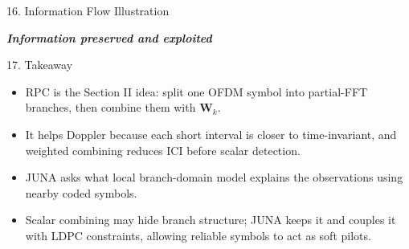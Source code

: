 \documentclass[aspectratio=169,10pt]{beamer}
\newcommand{\vW}{\bm{W}}
\newcommand{\vz}{\bm{z}}
\newcommand{\vC}{\bm{C}}
\newcommand{\hb}{\hat{b}}
\begin{document}
\begin{frame}{16. Information Flow Illustration}
\begin{center}
  \end{center}

  \vspace{-0.3em}
  \begin{center}
    {\footnotesize\itshape\bfseries\color{junagreen}Information preserved and exploited}
  \end{center}

\end{frame}

\begin{frame}{17. Takeaway}

  \begin{itemize}\setlength{\itemsep}{0.35em}
    \item RPC is the Section II idea: split one OFDM symbol into partial-FFT
          branches, then combine them with $\vW_k$.
    \item It helps Doppler because each short interval is closer to
          time-invariant, and weighted combining reduces ICI before scalar detection.
    \item JUNA asks what local branch-domain model explains the observations
          using nearby coded symbols.
    \item Scalar combining may hide branch structure; JUNA keeps it and couples
          it with LDPC constraints, allowing reliable symbols to act as soft pilots.
  \end{itemize}

  \vfill
  \begin{center}
  \end{center}
  \vspace{0.3em}
\end{frame}
\end{document}

